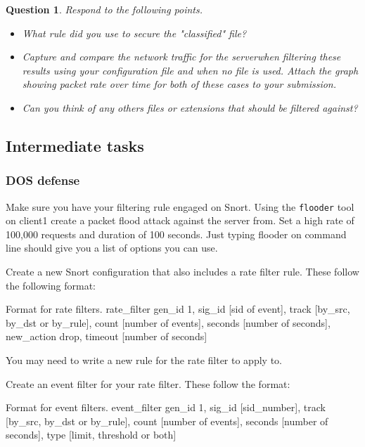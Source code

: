 \documentclass[a4paper,11pt,hidelinks]{article}
\newtheorem{theorem}{Question}[subsection]
\begin{document}
\begin{theorem}
    Respond to the following points.
    \begin{itemize}
        \item What rule did you use to secure the "classified" file?
        \item Capture and compare the network traffic for the serverwhen filtering these results using your configuration file and when no file is used. Attach the graph showing packet rate over time for both of these cases to your submission.
        \item Can you think of any others files or extensions that should be filtered against?
    \end{itemize}
\end{theorem}

\clearpage
\newpage

\subsection{Intermediate tasks}
\subsubsection{DOS defense}

Make sure you have your filtering rule engaged on Snort. Using the \verb=flooder= tool on client1 create a packet flood attack against the server from. Set a high rate of 100,000 requests and duration of 100 seconds. Just typing flooder on command line should give you a list of options you can use.

Create a new Snort configuration that also includes a rate filter rule. These follow the following format:

\begin{code}{Format for rate filters.}
rate_filter gen_id 1, sig_id [sid of event], 
track [by_src, by_dst or by_rule], count [number of events], 
seconds [number of seconds], new_action drop, 
timeout [number of seconds]
\end{code}

You may need to write a new rule for the rate filter to apply to. 

Create an event filter for your rate filter. These follow the format:

\begin{code}{Format for event filters.}
event_filter gen_id 1, sig_id [sid_number], 
track [by_src, by_dst or by_rule], count [number of events],
seconds [number of seconds],
type [limit, threshold or both]
\end{code}
\end{document}
